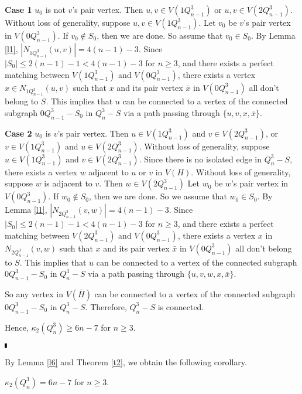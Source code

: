 \documentclass[preprint,number,12pt]{elsarticle}
\begin{document}
\textbf{Case 1 } $u_{0}$ is not $v$'s pair vertex.
Then $u,v\in V(1Q_{n-1}^{3})$ or $u,v\in V(2Q_{n-1}^{3})$.
Without loss of generality, suppose $u,v\in V(1Q_{n-1}^{3})$.
Let $v_{0}$ be $v$'s pair vertex in $V(0Q_{n-1}^{3})$. If $v_{0} \not\in S_{0}$,
then we are done. So assume that $v_0 \in S_{0}$.
By Lemma \ref{l1}, $|N_{1Q_{n-1}^{3}}(u, v)|=4(n-1)-3$.
Since $|S_0|\le 2(n-1)-1<4(n-1)-3$ for $n\ge 3$, and there exists a perfect matching between
$V(1Q_{n-1}^{3})$ and $V(0Q_{n-1}^{3})$, there exists a vertex $x \in N_{1Q_{n-1}^{3}}(u, v)$ such that
$x$ and its pair vertex $\bar{x}$ in $V(0Q_{n-1}^3)$ all don't belong to $S$.
This implies that $u$ can be connected to a vertex of the connected subgraph $0Q_{n-1}^{3}-S_0$ in $Q_{n}^{3}-S$
via a path passing through $\{u, v, x,\bar{x}\}$.

\textbf{Case 2 } $u_{0}$ is $v$'s pair vertex. Then $u\in V(1Q_{n-1}^{3})$ and $v\in V(2Q_{n-1}^{3})$,
or $v\in V(1Q_{n-1}^{3})$ and $u\in V(2Q_{n-1}^{3})$.
Without loss of generality, suppose $u\in V(1Q_{n-1}^{3})$ and $v\in V(2Q_{n-1}^{3})$.
Since there is no isolated edge in $Q_{n}^{3}-S$, there exists a vertex $w$ adjacent to $u$ or $v$ in $V(H)$. Without loss of generality, suppose $w$ is adjacent to $v$. Then $w\in V(2Q_{n-1}^{3})$
Let $w_{0}$ be $w$'s pair vertex in $V(0Q_{n-1}^{3})$. If $w_{0} \not\in S_{0}$, then we are done.
So we assume that $w_{0} \in S_{0}$.
By Lemma \ref{l1}, $|N_{2Q_{n-1}^{3}}(v, w)|=4(n-1)-3$. Since
$|S_0|\le 2(n-1)-1<4(n-1)-3$ for $n\ge 3$, and there exists a perfect matching between
$V(2Q_{n-1}^{3})$ and $V(0Q_{n-1}^{3})$, there
exists a vertex $x$ in $N_{2Q_{n-1}^{3}}(v,w)$ such that $x$ and its pair vertex $\bar{x}$ in $V(0Q_{n-1}^3)$
all don't belong to $S$.
This implies that $u$ can be connected to a vertex of the connected subgraph $0Q_{n-1}^{3}-S_0$ in 
$Q_{n}^{3}-S$ via a path passing through $\{u, v, w, x,\bar{x}\}$.

So any vertex in $V(\bar{H})$ can be connected to a vertex of the connected subgraph $0Q_{n-1}^{3}-S_{0}$ in $Q_{n}^{3}-S$. Therefore, $Q_{n}^{3}-S$ is connected. 

Hence, $\kappa_2(Q_{n}^{3})\ge 6n-7$ for $n \geq 3$.

$\hfill\rule{1mm}{2mm}$

By Lemma \ref{l6} and Theorem \ref{t2}, we obtain the following corollary.
\begin{cor}
$\kappa_2(Q_{n}^{3})=6n-7$ for $n \geq 3$.
\end{cor}
\end{document}
